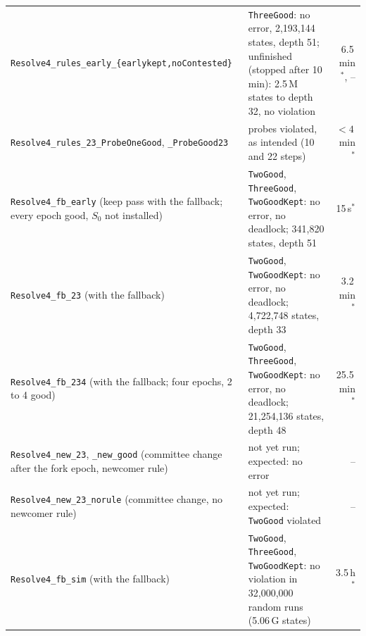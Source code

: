 \documentclass[conference]{IEEEtran}
\begin{document}
\begin{table}[t]
\begin{tabularx}{\textwidth}{@{}>{\raggedright\arraybackslash}p{}Yr@{}}
\texttt{Resolve4\_\allowbreak{}rules\_\allowbreak{}early\_\allowbreak{}\{earlykept,\allowbreak{}noContested\}} & \texttt{ThreeGood}: no error, 2,193,144 states, depth 51; unfinished (stopped after 10\,min): 2.5\,M states to depth 32, no violation & 6.5\,min$^*$, --\\
\texttt{Resolve4\_\allowbreak{}rules\_\allowbreak{}23\_\allowbreak{}ProbeOneGood},\allowbreak{} \texttt{\_\allowbreak{}ProbeGood23} & probes violated, as intended (10 and 22 steps) & $<4$\,min$^*$\\
\texttt{Resolve4\_\allowbreak{}fb\_\allowbreak{}early} (keep pass with the fallback; every epoch good, $S_0$ not installed) & \texttt{TwoGood}, \texttt{ThreeGood}, \texttt{TwoGoodKept}: no error, no deadlock; 341,820 states, depth 51 & 15\,s$^*$\\
\texttt{Resolve4\_\allowbreak{}fb\_\allowbreak{}23} (with the fallback) & \texttt{TwoGood}, \texttt{TwoGoodKept}: no error, no deadlock; 4,722,748 states, depth 33 & 3.2\,min$^*$\\
\texttt{Resolve4\_\allowbreak{}fb\_\allowbreak{}234} (with the fallback; four epochs, 2 to 4 good) & \texttt{TwoGood}, \texttt{ThreeGood}, \texttt{TwoGoodKept}: no error, no deadlock; 21,254,136 states, depth 48 & 25.5\,min$^*$\\
\texttt{Resolve4\_\allowbreak{}new\_\allowbreak{}23},\allowbreak{} \texttt{\_\allowbreak{}new\_\allowbreak{}good} (committee change after the fork epoch, newcomer rule) & not yet run; expected: no error & --\\
\texttt{Resolve4\_\allowbreak{}new\_\allowbreak{}23\_\allowbreak{}norule} (committee change, no newcomer rule) & not yet run; expected: \texttt{TwoGood} violated & --\\
\texttt{Resolve4\_\allowbreak{}fb\_\allowbreak{}sim} (with the fallback) & \texttt{TwoGood}, \texttt{ThreeGood}, \texttt{TwoGoodKept}: no violation in 32,000,000 random runs (5.06\,G states) & 3.5\,h$^*$\\
\bottomrule
\end{tabularx}
\end{table}
\end{document}
